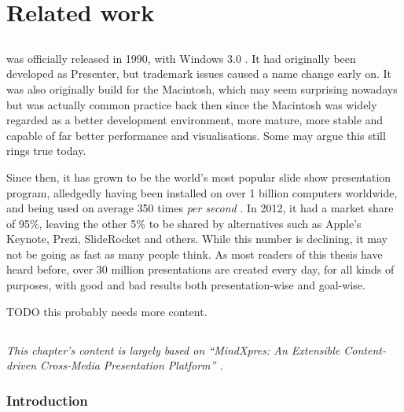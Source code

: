 
 \chapter{Related work}

  \section{\ppt}

   \ppt was officially released in 1990, with Windows 3.0 \citep{austin-1}. It
   had originally been developed as Presenter, but trademark issues caused a
   name change early on. It was also originally build for the Macintosh, which
   may seem surprising nowadays but was actually common practice back then
   since the Macintosh was widely regarded as a better development environment,
   more mature, more stable and capable of far better performance and
   visualisations. Some may argue this still rings true today.

   Since then, it has grown to be the world's most popular slide show
   presentation program, alledgedly having been installed on over 1 billion
   computers worldwide, and being used on average 350 times \emph{per second}
   \citep{parks-1}. In 2012, it had a market share of 95\%, leaving the other
   5\% to be shared by alternatives such as Apple's Keynote, Prezi, SlideRocket
   and others. While this number is declining, it may not be going as fast as
   many people think. As most readers of this thesis have heard before, over 30
   million \ppt presentations are created every day, for all kinds of purposes,
   with good and bad results both presentation-wise and goal-wise.

   TODO this probably needs more content.

  \section{\mxp}

   \emph{This chapter's content is largely based on ``MindXpres: An Extensible
   Content-driven Cross-Media Presentation Platform'' \citep{roels-1}.}

   \subsection{Introduction}


